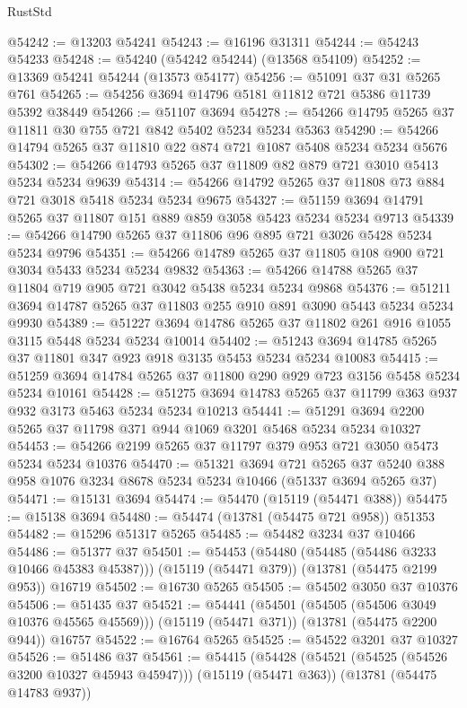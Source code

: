 \begin{lexlean}{RustStd}
\begin{coremodule}
@54242 := @13203 @54241
@54243 := @16196 @31311
@54244 := @54243 @54233
@54248 := @54240 (@54242 @54244) (@13568 @54109)
@54252 := @13369 @54241 @54244 (@13573 @54177)
@54256 := @51091 @37 @31 @5265 @761
@54265 := @54256 @3694 @14796 @5181 @11812 @721 @5386 @11739 @5392 @38449
@54266 := @51107 @3694
@54278 := @54266 @14795 @5265 @37 @11811 @30 @755 @721 @842 @5402 @5234 @5234 @5363
@54290 := @54266 @14794 @5265 @37 @11810 @22 @874 @721 @1087 @5408 @5234 @5234 @5676
@54302 := @54266 @14793 @5265 @37 @11809 @82 @879 @721 @3010 @5413 @5234 @5234 @9639
@54314 := @54266 @14792 @5265 @37 @11808 @73 @884 @721 @3018 @5418 @5234 @5234 @9675
@54327 := @51159 @3694 @14791 @5265 @37 @11807 @151 @889 @859 @3058 @5423 @5234 @5234 @9713
@54339 := @54266 @14790 @5265 @37 @11806 @96 @895 @721 @3026 @5428 @5234 @5234 @9796
@54351 := @54266 @14789 @5265 @37 @11805 @108 @900 @721 @3034 @5433 @5234 @5234 @9832
@54363 := @54266 @14788 @5265 @37 @11804 @719 @905 @721 @3042 @5438 @5234 @5234 @9868
@54376 := @51211 @3694 @14787 @5265 @37 @11803 @255 @910 @891 @3090 @5443 @5234 @5234 @9930
@54389 := @51227 @3694 @14786 @5265 @37 @11802 @261 @916 @1055 @3115 @5448 @5234 @5234 @10014
@54402 := @51243 @3694 @14785 @5265 @37 @11801 @347 @923 @918 @3135 @5453 @5234 @5234 @10083
@54415 := @51259 @3694 @14784 @5265 @37 @11800 @290 @929 @723 @3156 @5458 @5234 @5234 @10161
@54428 := @51275 @3694 @14783 @5265 @37 @11799 @363 @937 @932 @3173 @5463 @5234 @5234 @10213
@54441 := @51291 @3694 @2200 @5265 @37 @11798 @371 @944 @1069 @3201 @5468 @5234 @5234 @10327
@54453 := @54266 @2199 @5265 @37 @11797 @379 @953 @721 @3050 @5473 @5234 @5234 @10376
@54470 := @51321
    @3694
    @721
    @5265
    @37
    @5240
    @388
    @958
    @1076
    @3234
    @8678
    @5234
    @5234
    @10466
    (@51337 @3694 @5265 @37)
@54471 := @15131 @3694
@54474 := @54470 (@15119 (@54471 @388))
@54475 := @15138 @3694
@54480 := @54474 (@13781 (@54475 @721 @958)) @51353
@54482 := @15296 @51317 @5265
@54485 := @54482 @3234 @37 @10466
@54486 := @51377 @37
@54501 := @54453
    (@54480 (@54485 (@54486 @3233 @10466 @45383 @45387)))
    (@15119 (@54471 @379))
    (@13781 (@54475 @2199 @953))
    @16719
@54502 := @16730 @5265
@54505 := @54502 @3050 @37 @10376
@54506 := @51435 @37
@54521 := @54441
    (@54501 (@54505 (@54506 @3049 @10376 @45565 @45569)))
    (@15119 (@54471 @371))
    (@13781 (@54475 @2200 @944))
    @16757
@54522 := @16764 @5265
@54525 := @54522 @3201 @37 @10327
@54526 := @51486 @37
@54561 := @54415
    (@54428
      (@54521 (@54525 (@54526 @3200 @10327 @45943 @45947)))
      (@15119 (@54471 @363))
      (@13781 (@54475 @14783 @937))

\end{coremodule}
\end{lexlean}
